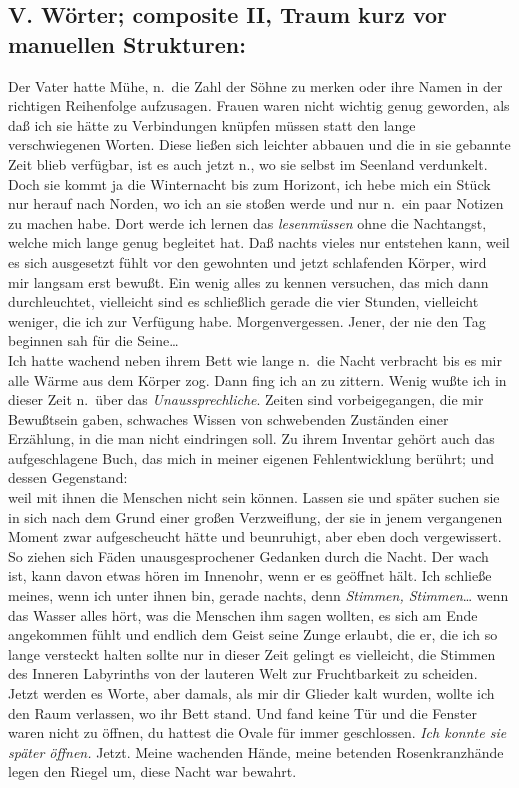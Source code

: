 \documentclass[
]{article}
\author{}
\date{\vspace{-2.5em}}
\begin{document}
\subsection{V. Wörter; composite II, Traum kurz vor manuellen
Strukturen:}\label{v.-wuxf6rter-composite-ii-traum-kurz-vor-manuellen-strukturen}

Der Vater hatte Mühe, n.~die Zahl der Söhne zu merken oder ihre Namen in
der richtigen Reihenfolge aufzusagen\emph{. }Frauen waren nicht wichtig
genug geworden, als daß ich sie hätte zu Verbindungen knüpfen müssen
statt den lange verschwiegenen Worten. Diese ließen sich leichter
abbauen und die in sie gebannte Zeit blieb verfügbar, ist es auch jetzt
n., wo sie selbst im Seenland verdunkelt. Doch sie kommt ja die
Winternacht bis zum Horizont, ich hebe mich ein Stück nur herauf nach
Norden, wo ich an sie stoßen werde und nur n.~ein paar Notizen zu machen
habe. Dort werde ich lernen das \emph{lesenmüssen} ohne die Nachtangst,
welche mich lange genug begleitet hat. Daß nachts vieles nur entstehen
kann, weil es sich ausgesetzt fühlt vor den gewohnten und jetzt
schlafenden Körper, wird mir langsam erst bewußt. Ein wenig alles zu
kennen versuchen, das mich dann durchleuchtet, vielleicht sind es
schließlich gerade die vier Stunden, vielleicht weniger, die ich zur
Verfügung habe. Morgenvergessen. Jener, der nie den Tag beginnen sah für
die Seine\ldots{}\\
Ich hatte wachend neben ihrem Bett wie lange n.~die Nacht verbracht bis
es mir alle Wärme aus dem Körper zog. Dann fing ich an zu zittern. Wenig
wußte ich in dieser Zeit n.~über das \emph{Unaussprechliche}. Zeiten
sind vorbeigegangen, die mir Bewußtsein gaben, schwaches Wissen von
schwebenden Zuständen einer Erzählung, in die man nicht eindringen soll.
Zu ihrem Inventar gehört auch das aufgeschlagene Buch, das mich in
meiner eigenen Fehlentwicklung berührt; und dessen Gegenstand:\\
weil mit ihnen die Menschen nicht sein können. Lassen sie und später
suchen sie in sich nach dem Grund einer großen Verzweiflung, der sie in
jenem vergangenen Moment zwar aufgescheucht hätte und beunruhigt, aber
eben doch vergewissert. So ziehen sich Fäden unausgesprochener Gedanken
durch die Nacht. Der wach ist, kann davon etwas hören im Innenohr, wenn
er es geöffnet hält. Ich schließe meines, wenn ich unter ihnen bin,
gerade nachts, denn \emph{Stimmen, Stimmen}\ldots{} wenn das Wasser
alles hört, was die Menschen ihm sagen wollten, es sich am Ende
angekommen fühlt und endlich dem Geist seine Zunge erlaubt, die er, die
ich so lange versteckt halten sollte nur in dieser Zeit gelingt es
vielleicht, die Stimmen des Inneren Labyrinths von der lauteren Welt zur
Fruchtbarkeit zu scheiden. Jetzt werden es Worte, aber damals, als mir
dir Glieder kalt wurden, wollte ich den Raum verlassen, wo ihr Bett
stand. Und fand keine Tür und die Fenster waren nicht zu öffnen, du
hattest die Ovale für immer geschlossen. \emph{Ich konnte sie später
öffnen. }Jetzt. Meine wachenden Hände, meine betenden Rosenkranzhände
legen den Riegel um, diese Nacht war bewahrt.
\end{document}
